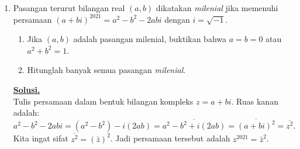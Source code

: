 \documentclass[12pt,twoside]{article}
\newenvironment{solution}
{
	\par\noindent\textbf{\underline{Solusi.}}\\
}
{
	\par
}
\begin{document}
\begin{enumerate}
\begin{solution}
          Jadi baris $k$ yang baru hanya memiliki elemen tak nol bernilai 2 di kolom $k-1$.
          Matriks menjadi:
          \[
            A'' = \begin{pmatrix}
              0      & 1      & 2      & \cdots   & n-1    \\
              1      & -1     & -1     & \cdots   & -1     \\
              0      & 2      & 0      & \cdots   & 0      \\
              0      & 0      & 2      & \cdots   & 0      \\
              \vdots & \vdots & \vdots & \ddots   & \vdots \\
              0      & 0      & 0      & \cdots 2 & 0
            \end{pmatrix}
          \]
          Perhatikan struktur baris ke-3 sampai ke-$n$.
          Baris 3 punya 2 di kolom 2. Baris 4 punya 2 di kolom 3. ... Baris $n$ punya 2 di kolom $n-1$.
          Kita ekspansi kofaktor sepanjang baris-baris ini (mulai dari $n$ sampai 3).
          Setiap langkah memberikan faktor $(-1)^{\text{row}+\text{col}} \cdot 2$.
          Posisi elemen 2 di baris $k$ adalah $(k, k-1)$.
          Tanda: $(-1)^{k + k-1} = (-1)^{2k-1} = -1$.
          Kita lakukan sebanyak $n-2$ kali (untuk $k=3 \dots n$).
          Total faktor: $(-1)^{n-2} \cdot 2^{n-2}$.
          Sisa matriks adalah submatriks $2 \times 2$ yang terdiri dari baris 1, 2 dan kolom yang belum terhapus (kolom 1 dan kolom $n$).
          Submatriks: $\begin{pmatrix} 0 & n-1 \\ 1 & -1 \end{pmatrix}$.
          Determinannya: $0(-1) - 1(n-1) = -(n-1)$.
          Jadi, total determinan:
          \[ \det(A_n) = [(-1)^{n-2} 2^{n-2}] \cdot [-(n-1)] = (-1)^{n-1} (n-1) 2^{n-2}. \]
        \end{solution}
  \item Pasangan terurut bilangan real $(a,b)$ dikatakan \textit{milenial} jika memenuhi persamaan $(a+bi)^{2021}=a^2-b^2-2abi$ dengan $i=\sqrt{-1}$.
        \begin{enumerate}
          \item Jika $(a,b)$ adalah pasangan milenial, buktikan bahwa $a=b=0$ atau $a^2+b^2=1$.
          \item Hitunglah banyak semua pasangan \textit{milenial}.
        \end{enumerate}
        \begin{solution}
          Tulis persamaan dalam bentuk bilangan kompleks $z = a+bi$.
          Ruas kanan adalah:
          \[ a^2-b^2-2abi = (a^2-b^2) - i(2ab) = \overline{a^2-b^2 + i(2ab)} = \overline{(a+bi)^2} = \overline{z^2}. \]
          Kita ingat sifat $\overline{z^2} = (\bar{z})^2$.
          Jadi persamaan tersebut adalah $z^{2021} = \bar{z}^2$.


\end{solution}
\end{enumerate}
\end{document}
